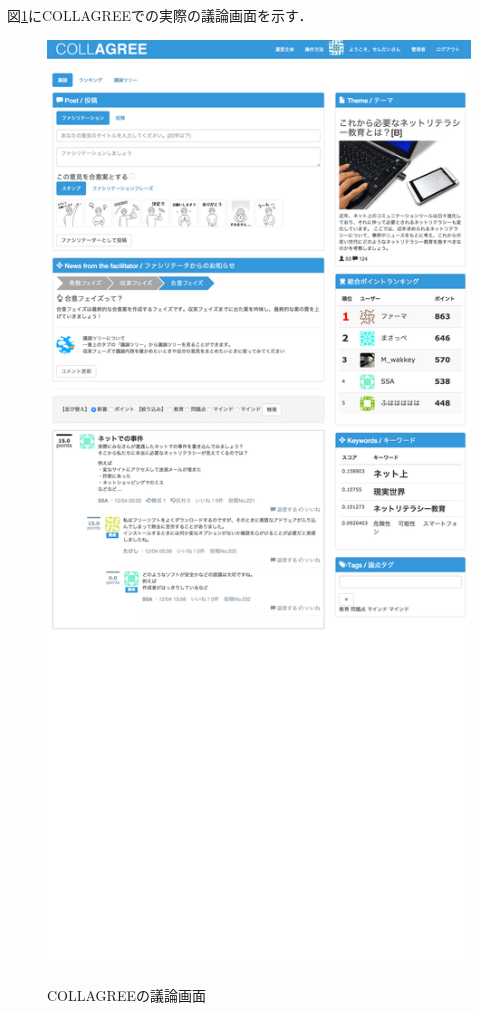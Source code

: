 図\ref{Fig:collagreeDiscuss}にCOLLAGREEでの実際の議論画面を示す．
\begin{figure}[htbp]
 \begin{center}
 \caption{COLLAGREEの議論画面}
  \includegraphics[width=\textwidth]{../images/2.Related_Work/COLLAGREE_Discuss-min.png}
  \label{Fig:collagreeDiscuss}
  \vspace{-10pt}
 \end{center}
\end{figure}
